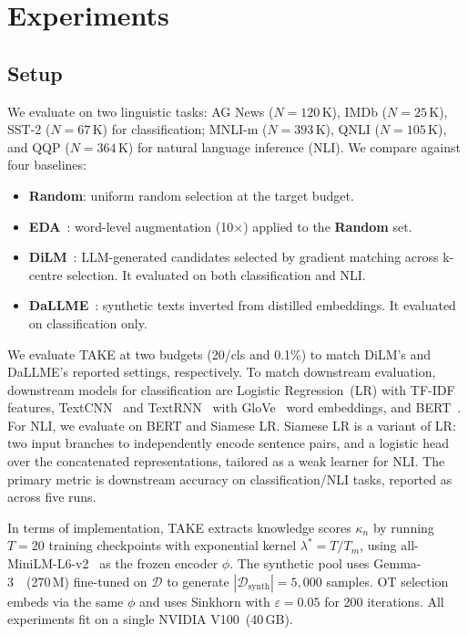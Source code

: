 ﻿\section{Experiments} \label{sec:05-experiments}
\subsection{Setup} \label{sec:05-setup}
\begin{foldable} %
  We evaluate on two linguistic tasks: AG News ($N=120$\,K), IMDb ($N=25$\,K), SST-2 ($N=67$\,K) for classification; MNLI-m ($N=393$\,K), QNLI ($N=105$\,K), and QQP ($N=364$\,K) for natural language inference (NLI).
  We compare against four baselines:
  \begin{itemize}
    \item \textbf{Random}: uniform random selection at the target budget.
    \item \textbf{EDA}~\cite{wei2019eda}: word-level augmentation (10$\times$) applied to the \textbf{Random} set.
    \item \textbf{DiLM}~\cite{maekawa2024dilm}: LLM-generated candidates selected by gradient matching across k-centre selection. It evaluated on both classification and NLI.
    \item \textbf{DaLLME}~\cite{tao2024textual}: synthetic texts inverted from distilled embeddings. It evaluated on classification only.
  \end{itemize}
  We evaluate TAKE at two budgets (20/cls and 0.1\%) to match DiLM's and DaLLME's reported settings, respectively.
  To match downstream evaluation, downstream models for classification are Logistic Regression~(LR) with TF-IDF~\cite{salton1988term} features, TextCNN~\cite{kim2014convolutional} and TextRNN~\cite{liu2016recurrent} with GloVe~\cite{pennington2014glove} word embeddings, and BERT~\cite{devlin2019bert}.
  For NLI, we evaluate on BERT and Siamese LR.
  Siamese LR is a variant of LR: two input branches to independently encode sentence pairs, and a logistic head over the concatenated representations, tailored as a weak learner for NLI.
  The primary metric is downstream accuracy on classification/NLI tasks, reported as  across five runs.
\end{foldable}

\begin{foldable} %
  In terms of implementation, TAKE extracts knowledge scores $\kappa_n$ by running $T=20$ training checkpoints with exponential kernel $\lambda^* = T/T_m$, using all-MiniLM-L6-v2~\cite{wang2020minilm} as the frozen encoder $\phi$.
  The synthetic pool uses Gemma-3~\cite{kamath2025gemma}~(270\,M) fine-tuned on $\mathcal{D}$ to generate $|\mathcal{D}_\text{synth}|=5{,}000$ samples.
  OT selection embeds via the same $\phi$ and uses Sinkhorn with $\varepsilon=0.05$ for 200 iterations.
  All experiments fit on a single NVIDIA V100~(40\,GB).
\end{foldable}

